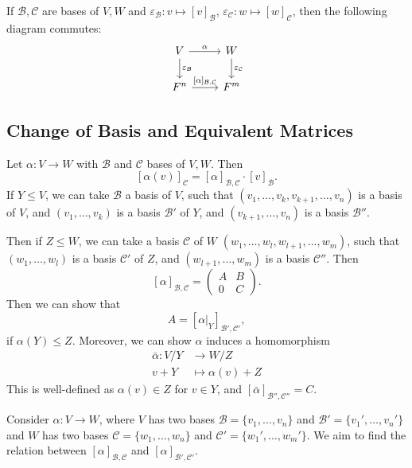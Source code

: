 \documentclass[12pt]{article}
\begin{document}
\begin{remark}
	If $\mathcal{B}, \mathcal{C}$ are bases of $V, W$ and $\varepsilon_{\mathcal{B}} : v \mapsto [v]_{\mathcal{B}}$, $\varepsilon_{\mathcal{C}} : w \mapsto [w]_{\mathcal{C}}$, then the following diagram commutes:
	\[
		\begin{tikzcd}
			V \arrow[r, "\alpha"] \arrow[d, "\varepsilon_{\mathcal{B}}"] & W \arrow[d, "\varepsilon_{\mathcal{C}}"] \\
			F^{n} \arrow[r, "{[\alpha]_{\mathcal{B},\mathcal{C}}}"] & F^{m}
		\end{tikzcd}
	\] 
\end{remark}

\subsection{Change of Basis and Equivalent Matrices}%
\label{sub:change_of_basis_and_equivalent_matrices}

Let $\alpha : V \to W$ with $\mathcal{B}$ and $\mathcal{C}$ bases of $V, W$. Then
\[
	[\alpha(v)]_{\mathcal{C}} = [\alpha]_{\mathcal{B}, \mathcal{C}} \cdot [v]_{\mathcal{B}}
.\]
If $Y \leq V$, we can take $\mathcal{B}$ a basis of $V$, such that $(v_1, \ldots, v_k, v_{k+1}, \ldots, v_n)$ is a basis of $V$, and $(v_1, \ldots, v_k)$ is a basis $\mathcal{B}'$ of $Y$, and $(v_{k+1}, \ldots, v_n)$ is a basis $\mathcal{B}''$.

Then if $Z \leq W$, we can take a basis $\mathcal{C}$ of $W$ $(w_1, \ldots, w_l, w_{l+1}, \ldots, w_m)$, such that $(w_1, \ldots, w_l)$ is a basis $\mathcal{C}'$ of $Z$, and $(w_{l+1}, \ldots, w_m)$ is a basis $\mathcal{C}''$. Then
\[
	[\alpha]_{\mathcal{B}, \mathcal{C}} =
	\begin{pmatrix}
		A & B \\
		0 & C
	\end{pmatrix}
.\]
Then we can show that
\[
	A = [\alpha|_{Y}]_{\mathcal{B}', \mathcal{C}'}
,\]
if $\alpha(Y) \leq Z$. Moreover, we can show $\alpha$ induces a homomorphism
\begin{align*}
	\bar \alpha : V / Y &\to W / Z \\
	v + Y &\mapsto \alpha(v) + Z
\end{align*}
This is well-defined as $\alpha(v) \in Z$ for $v \in Y$, and $[\bar \alpha]_{\mathcal{B}'', \mathcal{C}''} = C$.

Consider $\alpha : V \to W$, where $V$ has two bases $\mathcal{B} = \{v_1, \ldots, v_n\}$ and $\mathcal{B}' = \{v_1', \ldots, v_n'\}$ and $W$ has two bases $\mathcal{C} = \{w_1, \ldots, w_n\}$ and $\mathcal{C}' = \{w_1', \ldots, w_m'\}$. We aim to find the relation between $[\alpha]_{\mathcal{B}, \mathcal{C}}$ and $[\alpha]_{\mathcal{B}', \mathcal{C}'}$.
\end{document}
